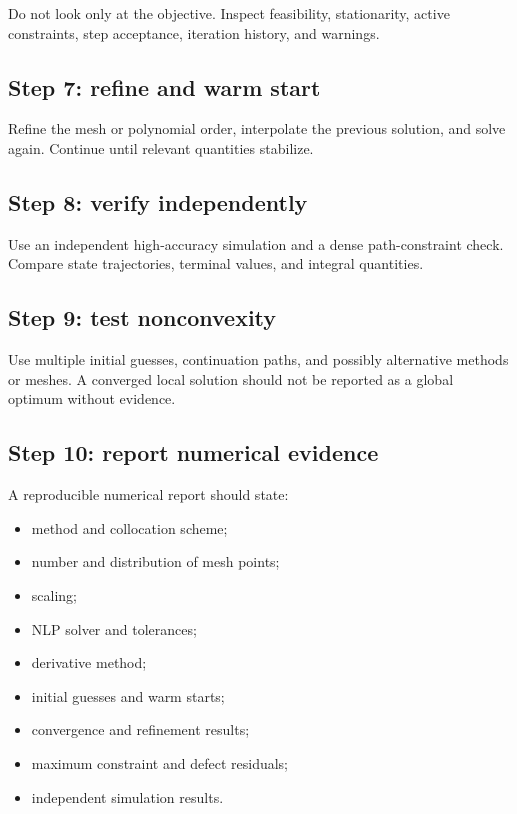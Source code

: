 \documentclass[11pt]{article}
\begin{document}
Do not look only at the objective. Inspect feasibility, stationarity, active constraints, step acceptance, iteration history, and warnings.

\subsection{Step 7: refine and warm start}

Refine the mesh or polynomial order, interpolate the previous solution, and solve again. Continue until relevant quantities stabilize.

\subsection{Step 8: verify independently}

Use an independent high-accuracy simulation and a dense path-constraint check. Compare state trajectories, terminal values, and integral quantities.

\subsection{Step 9: test nonconvexity}

Use multiple initial guesses, continuation paths, and possibly alternative methods or meshes. A converged local solution should not be reported as a global optimum without evidence.

\subsection{Step 10: report numerical evidence}

A reproducible numerical report should state:
\begin{itemize}[leftmargin=1.4em]
  \item method and collocation scheme;
  \item number and distribution of mesh points;
  \item scaling;
  \item NLP solver and tolerances;
  \item derivative method;
  \item initial guesses and warm starts;
  \item convergence and refinement results;
  \item maximum constraint and defect residuals;
  \item independent simulation results.
\end{itemize}
\end{document}
